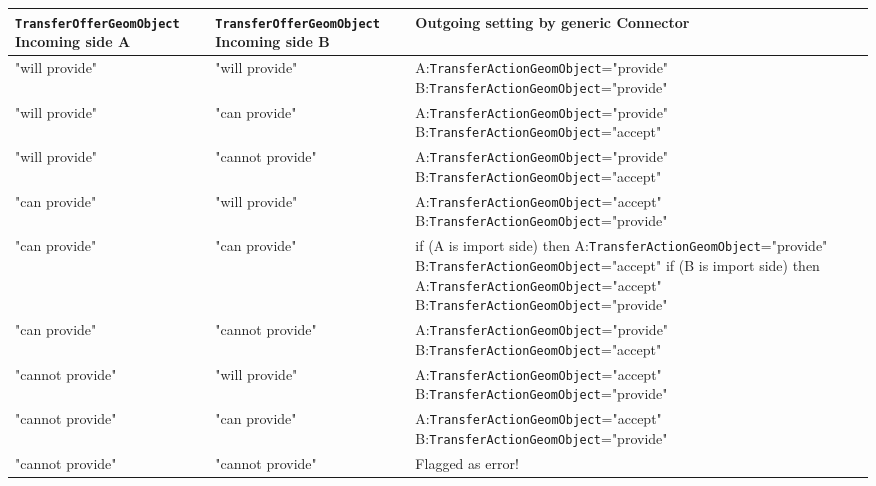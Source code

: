 \begin{tabular}[h]{|p{4.5cm}|p{4.5cm}|p{7cm}|}
     \hline\hline
     {\bf {\tt TransferOfferGeomObject} Incoming side A} & {\bf {\tt TransferOfferGeomObject} Incoming side B} & {\bf Outgoing setting by generic Connector}\\
     \hline\hline
     "will provide" & "will provide"    & A:{\tt TransferActionGeomObject}="provide" B:{\tt TransferActionGeomObject}="provide"\\ \hline
     "will provide" & "can provide"     & A:{\tt TransferActionGeomObject}="provide" B:{\tt TransferActionGeomObject}="accept"\\ \hline
     "will provide" & "cannot provide"  & A:{\tt TransferActionGeomObject}="provide" B:{\tt TransferActionGeomObject}="accept"\\ \hline
     "can provide"  & "will provide"    & A:{\tt TransferActionGeomObject}="accept"  B:{\tt TransferActionGeomObject}="provide"\\ \hline
     "can provide"  & "can provide"     & if (A is import side) then\newline
     A:{\tt TransferActionGeomObject}="provide" B:{\tt TransferActionGeomObject}="accept"
     if (B is import side) then\newline
     A:{\tt TransferActionGeomObject}="accept" B:{\tt TransferActionGeomObject}="provide"\\ \hline
     "can provide"  & "cannot provide"  & A:{\tt TransferActionGeomObject}="provide" B:{\tt TransferActionGeomObject}="accept"\\ \hline
     "cannot provide" & "will provide"  & A:{\tt TransferActionGeomObject}="accept"  B:{\tt TransferActionGeomObject}="provide"\\ \hline
     "cannot provide" & "can provide"   & A:{\tt TransferActionGeomObject}="accept"  B:{\tt TransferActionGeomObject}="provide"\\ \hline
     "cannot provide" & "cannot provide"& Flagged as error!\\ \hline
     \hline
\end{tabular}\newline





